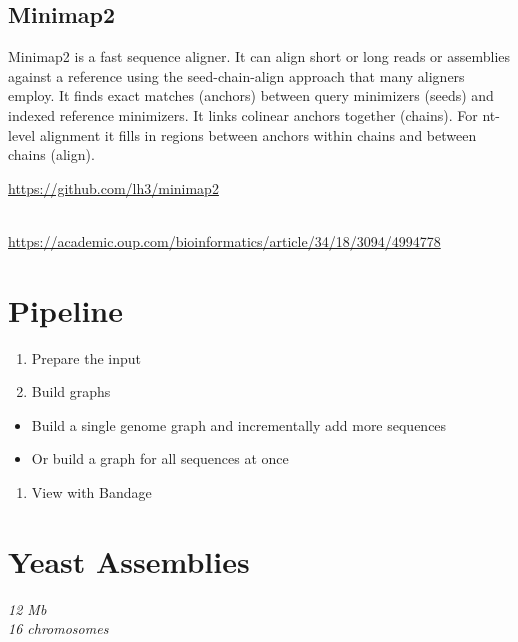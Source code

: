 \documentclass[
]{book}
\providecommand{\tightlist}{%
  \setlength{\itemsep}{0pt}\setlength{\parskip}{0pt}}
\begin{document}
\hypertarget{minimap2}{%
\subsection*{Minimap2}\label{minimap2}}

Minimap2 is a fast sequence aligner.
It can align short or long reads or assemblies against a reference using the seed-chain-align approach that many aligners employ. It finds exact matches (anchors) between query minimizers (seeds) and indexed reference minimizers. It links colinear anchors together (chains). For nt-level alignment it fills in regions between anchors within chains and between chains (align).

\url{https://github.com/lh3/minimap2}\strut \\
\url{https://academic.oup.com/bioinformatics/article/34/18/3094/4994778}

\hypertarget{pipeline}{%
\section{Pipeline}\label{pipeline}}

\begin{enumerate}
\def\labelenumi{\arabic{enumi}.}
\tightlist
\item
  Prepare the input
\item
  Build graphs
\end{enumerate}

\begin{itemize}
\tightlist
\item
  Build a single genome graph and incrementally add more sequences
\item
  Or build a graph for all sequences at once
\end{itemize}

\begin{enumerate}
\def\labelenumi{\arabic{enumi}.}
\setcounter{enumi}{2}
\tightlist
\item
  View with Bandage
\end{enumerate}

\hypertarget{yeast-assemblies}{%
\section{Yeast Assemblies}\label{yeast-assemblies}}

\emph{12 Mb}\\
\emph{16 chromosomes}
\end{document}
